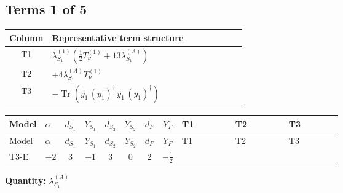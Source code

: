 \documentclass[8pt]{article}
\begin{document}
\begin{landscape}
\subsection*{Terms 1 of 5}
\begin{center}
\begin{tabular}{@{}c >{\raggedright\arraybackslash}p{0.82\linewidth}@{}}
\toprule
Column & Representative term structure \\
\midrule
T1 & \(\displaystyle {\lambda_{S_1}^{(1)}} \left(\frac{1}{2} T_{\nu}^{(1)}+13 {\lambda_{S_1}^{(A)}}\right)\) \\
\midrule
T2 & \(\displaystyle +4 {\lambda_{S_1}^{(A)}} T_{\nu}^{(1)}\) \\
\midrule
T3 & \(\displaystyle -\operatorname{Tr}\!\left({y_1}\,\left({y_1}\right)^{\dagger}\,{y_1}\,\left({y_1}\right)^{\dagger}\right)\) \\
\midrule
\bottomrule
\end{tabular}
\end{center}
\smallskip
\tiny
\begin{longtable}{@{}llcccccc >{\raggedright\arraybackslash}p{0.21\linewidth} >{\raggedright\arraybackslash}p{0.21\linewidth} >{\raggedright\arraybackslash}p{0.21\linewidth}@{}}
\toprule
Model & $\alpha$ & $d_{S_1}$ & $Y_{S_1}$ & $d_{S_2}$ & $Y_{S_2}$ & $d_F$ & $Y_F$ & T1 & T2 & T3 \\
\midrule
\endfirsthead
\toprule
Model & $\alpha$ & $d_{S_1}$ & $Y_{S_1}$ & $d_{S_2}$ & $Y_{S_2}$ & $d_F$ & $Y_F$ & T1 & T2 & T3 \\
\midrule
\endhead
T3-E & $-2$ & $3$ & $-1$ & $3$ & $0$ & $2$ & $-\frac{1}{2}$ & \scriptsize\adjustbox{max width=\linewidth}{$\begin{gathered} {\lambda_{S_1}^{(1)}} \left(\frac{1}{2} T_{\nu}^{(1)}+13 {\lambda_{S_1}^{(A)}}\right)\end{gathered}$} & \scriptsize\adjustbox{max width=\linewidth}{$\begin{gathered} +4 {\lambda_{S_1}^{(A)}} T_{\nu}^{(1)}\end{gathered}$} & \scriptsize\adjustbox{max width=\linewidth}{$\begin{gathered} -\operatorname{Tr}\!\left({y_1}\,\left({y_1}\right)^{\dagger}\,{y_1}\,\left({y_1}\right)^{\dagger}\right)\end{gathered}$} \\
\midrule
\bottomrule
\end{longtable}
\clearpage
\noindent\textbf{Quantity: }$\lambda_{S_1}^{(A)}$\par\smallskip

\end{landscape}
\end{document}

